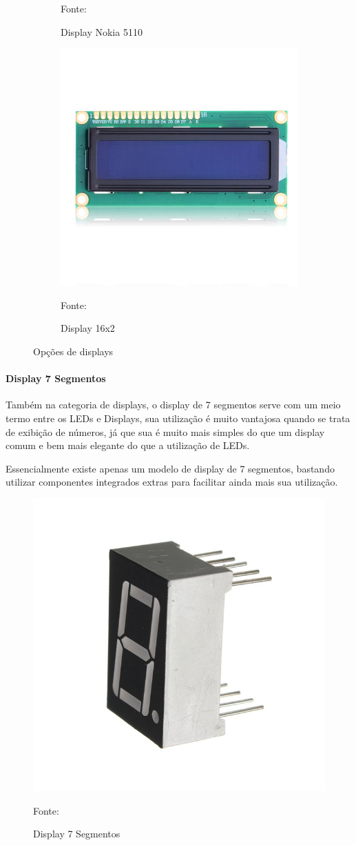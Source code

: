 \begin{figure}[h!]
\begin{subfigure}[b]{0.3\textwidth}
    \caption{Display Nokia 5110} Fonte: \cite{FilipeFlop2019a}
    \label{fig:display_nokia}
  \end{subfigure}
  \begin{subfigure}[b]{0.3\textwidth}
  \centering
    \includegraphics[width=\textwidth]{figuras/display_16x2.jpg}
    \caption{Display 16x2} Fonte: \cite{FilipeFlop}
    \label{fig:display_16x2}
  \end{subfigure}
  \caption{Opções de displays}
  \label{fig:displays}
\end{figure}

\paragraph*{Display 7 Segmentos}

Também na categoria de displays, o display de 7 segmentos serve com um meio termo entre os LEDs e Displays, sua utilização é muito vantajosa quando se trata de exibição de números, já que sua é muito mais simples do que um display comum e bem mais elegante do que a utilização de LEDs.

Essencialmente existe apenas um modelo de display de 7 segmentos, bastando utilizar componentes integrados extras para facilitar ainda mais sua utilização.

\begin{figure}[h!]
  \centering
    \includegraphics[width=.3\textwidth]{figuras/7seg.jpg}
    \caption{Display 7 Segmentos} Fonte: \cite{FilipeFlop2019b}
    \label{fig:7seg}
\end{figure}

